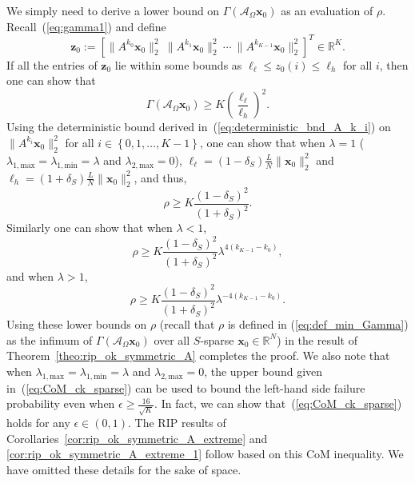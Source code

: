 \documentclass[11pt,draftcls,onecolumn]{IEEEtran}
\def\real    { \mathbb{R} }
\def \ak {{\mathcal{A}_{\Omega}}}
\newcommand{\vc}[1]{\boldsymbol{#1}}
\def\real    { \mathbb{R} }
\begin{document}
We simply need to derive a lower bound on $\Gamma(\ak\vc{x}_0)$ as an evaluation of $\rho$. Recall~(\ref{eq:gamma1}) and define
\[
\vc{z}_0 := \left[\|A^{k_0}\vc{x}_0\|_2^2 \ \|A^{k_1}\vc{x}_{0}\|_2^2 \ \cdots \ \|A^{k_{K-1}} \vc{x}_0\|_2^2\right]^T \in \real^K.
\]
If all the entries of $\vc{z}_0$ lie within some bounds as $\ell_{\ell} \leq z_0\left(i\right) \leq \ell_h$ for all $i$, then one can show that
\begin{equation}
\Gamma(\ak \vc{x}_0) \geq K\left(\frac{\ell_{\ell}}{\ell_h}\right)^2.
\label{eq:upper_bnd_Gamma_1}
\end{equation}
Using the deterministic bound derived in~(\ref{eq:deterministic_bnd_A_k_i}) on $\|A^{k_i}\vc{x}_0\|_2^2$ for all $i \in \left\{0,1,\dots,K-1\right\}$, one can show that when $\lambda = 1$ ($\lambda_{1,\text{max}} = \lambda_{1,\text{min}} = \lambda$ and $\lambda_{2,\text{max}} = 0$), $\ell_{\ell} = (1-\delta_S)\frac{L}{N}\|\vc{x}_0\|_2^2$ and $\ell_{h} = (1+\delta_S)\frac{L}{N}\|\vc{x}_0\|_2^2$, and thus,
\[
\rho \geq K\frac{(1-\delta_S)^2}{(1+\delta_S)^2}.
\]
Similarly one can show that when $\lambda <1$, 
\begin{equation}
\rho \geq K\frac{(1-\delta_S)^2}{(1+\delta_S)^2}\lambda^{4(k_{K-1}-k_0)},\label{eq:Gamma_bnd_lambda_L1}
\end{equation}
and when $\lambda >1$,
\begin{equation}
\rho \geq K\frac{(1-\delta_S)^2}{(1+\delta_S)^2}\lambda^{-4(k_{K-1}-k_0)}.\label{eq:Gamma_bnd_lambda_G1}
\end{equation}
Using these lower bounds on $\rho$ (recall that $\rho$ is defined in (\ref{eq:def_min_Gamma}) as the infimum of $\Gamma(\ak \vc{x}_0)$ over all $S$-sparse $\vc{x}_0 \in \real^N$) in the result of Theorem~\ref{theo:rip_ok_symmetric_A} completes the proof.
We also note that when $\lambda_{1,\text{max}} = \lambda_{1,\text{min}} = \lambda$ and $\lambda_{2,\text{max}} = 0$, the upper bound given in~(\ref{eq:CoM_ck_sparse}) can be used to bound the left-hand side failure probability even when $\epsilon \geq \frac{16}{\sqrt{K}}$. In fact, we can show that~(\ref{eq:CoM_ck_sparse}) holds for 
any $\epsilon \in (0,1)$. The \ac{RIP} results of Corollaries~\ref{cor:rip_ok_symmetric_A_extreme} and
\ref{cor:rip_ok_symmetric_A_extreme_1} follow based on this \ac{CoM} inequality. We have omitted these details for the sake of space.













\footnotesize


\end{document}
